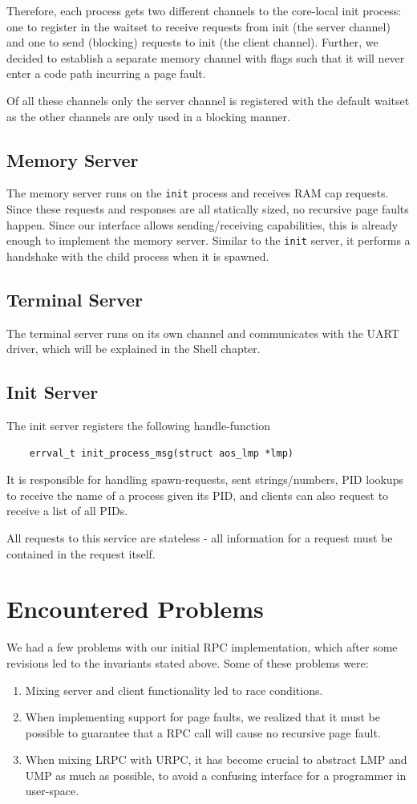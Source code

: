 Therefore, each process gets two different channels to the core-local init process:
one to register in the waitset to receive requests from init (the server channel) and
one to send (blocking) requests to init (the client channel). Further, we decided
to establish a separate memory channel with flags such that it will never
enter a code path incurring a page fault.

Of all these channels only the server channel is registered with the default
waitset as the other channels are only used in a blocking manner.

\subsection{Memory Server}
The memory server runs on the \texttt{init} process and receives RAM cap requests.
Since these requests and responses are all statically sized, no recursive page faults 
happen. Since our interface allows sending/receiving capabilities, this 
is already enough to implement the memory server.
Similar to the \texttt{init} server, it performs a handshake with the child process
when it is spawned. 
\subsection{Terminal Server}
The terminal server runs on its own channel and communicates with the UART driver, which will be explained in the Shell chapter.
\subsection{Init Server}
The init server registers the following handle-function 
\begin{verbatim}
    errval_t init_process_msg(struct aos_lmp *lmp)
\end{verbatim}
It is responsible for handling spawn-requests, sent strings/numbers, PID lookups to receive 
the name of a process given its PID, and clients can also request to receive a list of all PIDs.

All requests to this service are stateless - all information for a request must be 
contained in the request itself.


\section{Encountered Problems}
We had a few problems with our initial RPC implementation, 
which after some revisions led to the invariants stated above. Some of these problems were:
\begin{enumerate}
    \item Mixing server and client functionality led to race conditions.

    \item When implementing support for page faults, we realized that it must be possible 
to guarantee that a RPC call will cause no recursive page fault.

    \item When mixing LRPC with URPC, it has become crucial to abstract LMP and UMP as much 
as possible, to avoid a confusing interface for a programmer in user-space.
\end{enumerate}

